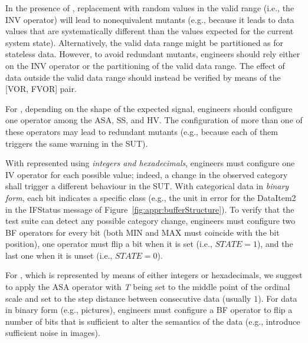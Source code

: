In the presence of , replacement with random values in the valid range (i.e., the INV operator) will lead to nonequivalent mutants (e.g., because it leads to data values that are systematically different than the values expected for the current system state). Alternatively, the valid data range might be partitioned as for stateless data. However, to avoid redundant mutants, engineers should rely either on the INV operator or the partitioning of the valid data range.
The effect of data outside the valid data range should instead be verified by means of the [VOR, FVOR] pair.

For , depending on the shape of the expected signal, engineers should configure one operator among the ASA, SS, and HV. The configuration of more than one of these operators may lead to redundant mutants (e.g., because each of them triggers the same warning in the SUT).

With  represented using \emph{integers and hexadecimals}, engineers must configure one IV operator for each possible value; indeed, a change in the observed category shall trigger a different behaviour in the SUT.
With categorical data in \emph{binary form}, each bit indicates a specific class (e.g., the unit in error for the DataItem2 in the IFStatus message of Figure~\ref{fig:appr:bufferStructure}).
To verify that the test suite can detect any possible category change, engineers must configure two BF operators for every bit (both MIN and MAX must coincide with the bit position), one operator must flip a bit when it is set (i.e., $\mathit{STATE}=1$), and the last one when it is unset (i.e., $\mathit{STATE}=0$).

For , which is represented by means of either integers or hexadecimals, we suggest to apply the ASA operator with \emph{T} being set to the middle point of the ordinal scale and \D set to the step distance between consecutive data (usually $1$). For data in binary form (e.g., pictures), engineers must configure a BF operator to flip a number of bits  that is sufficient to alter the semantics of the data (e.g., introduce sufficient noise in images).

